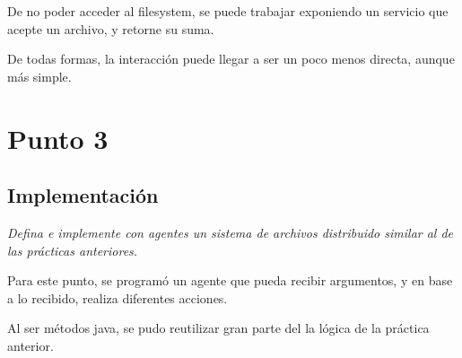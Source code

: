 \documentclass[12pt,journal,compsoc]{IEEEtran}
\begin{document}
De no poder acceder al filesystem, se puede trabajar exponiendo un
servicio que acepte un archivo, y retorne su suma.

De todas formas, la interacción puede llegar a ser un poco menos directa,
aunque más simple.

\section{Punto 3}

\subsection{Implementación}

\textit{Defina  e  implemente  con  agentes  un  sistema  de  archivos
distribuido  similar  al  de  las prácticas anteriores.}

Para este punto, se programó un agente que pueda recibir argumentos, y
en base a lo recibido, realiza diferentes acciones.

Al ser métodos java, se pudo reutilizar gran parte del la lógica de la
práctica anterior.
\end{document}
